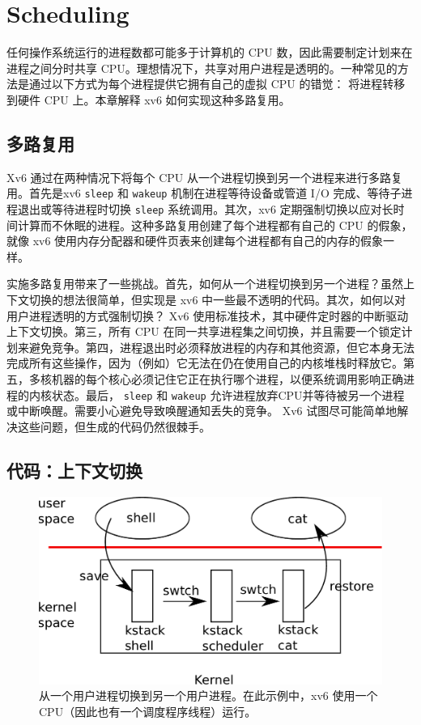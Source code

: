 

   \chapter{Scheduling}   
    \label{CH:SCHED}     

任何操作系统运行的进程数都可能多于计算机的 CPU 数，因此需要制定计划来在进程之间分时共享 CPU。理想情况下，共享对用户进程是透明的。一种常见的方法是通过以下方式为每个进程提供它拥有自己的虚拟 CPU 的错觉：
        将进程转移到硬件 CPU 上。本章解释 xv6 如何实现这种多路复用。
    \section{多路复用  }     

Xv6 通过在两种情况下将每个 CPU 从一个进程切换到另一个进程来进行多路复用。首先是xv6
    \lstinline{sleep}    和
    \lstinline{wakeup}    机制在进程等待设备或管道 I/O 完成、等待子进程退出或等待进程时切换
    \lstinline{sleep}    系统调用。其次，xv6 定期强制切换以应对长时间计算而不休眠的进程。这种多路复用创建了每个进程都有自己的 CPU 的假象，就像 xv6 使用内存分配器和硬件页表来创建每个进程都有自己的内存的假象一样。  

实施多路复用带来了一些挑战。首先，如何从一个进程切换到另一个进程？虽然上下文切换的想法很简单，但实现是 xv6 中一些最不透明的代码。其次，如何以对用户进程透明的方式强制切换？ Xv6 使用标准技术，其中硬件定时器的中断驱动上下文切换。第三，所有 CPU 在同一共享进程集之间切换，并且需要一个锁定计划来避免竞争。第四，进程退出时必须释放进程的内存和其他资源，但它本身无法完成所有这些操作，因为（例如）它无法在仍在使用自己的内核堆栈时释放它。第五，多核机器的每个核心必须记住它正在执行哪个进程，以便系统调用影响正确进程的内核状态。最后，   \lstinline{sleep}   和   \lstinline{wakeup}   允许进程放弃CPU并等待被另一个进程或中断唤醒。需要小心避免导致唤醒通知丢失的竞争。 Xv6 试图尽可能简单地解决这些问题，但生成的代码仍然很棘手。
    \section{代码：上下文切换  }     

   \begin{figure}[t]
\center
\includegraphics[scale=0.5]{fig/switch.pdf}
\caption{从一个用户进程切换到另一个用户进程。在此示例中，xv6 使用一个 CPU（因此也有一个调度程序线程）运行。  }
\label{fig:switch}
\end{figure}     

